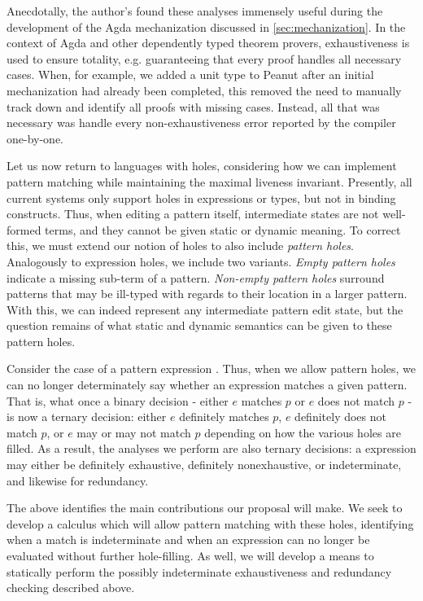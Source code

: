 Anecdotally, the author's found these analyses immensely useful during the development of the Agda mechanization discussed in \autoref{sec:mechanization}. In the context of Agda and other dependently typed theorem provers, exhaustiveness is used to ensure totality, e.g. guaranteeing that every proof handles all necessary cases. When, for example, we added a unit type to Peanut after an initial mechanization had already been completed, this removed the need to manually track down and identify all proofs with missing cases. Instead, all that was necessary was handle every non-exhaustiveness error reported by the compiler one-by-one.

Let us now return to languages with holes, considering how we can implement pattern matching while maintaining the maximal liveness invariant. Presently, all current systems only support holes in expressions or types, but not in binding constructs. Thus, when editing a pattern itself, intermediate states are not well-formed terms, and they cannot be given static or dynamic meaning. To correct this, we must extend our notion of holes to also include \emph{pattern holes}. Analogously to expression holes, we include two variants. \emph{Empty pattern holes} indicate a missing sub-term of a pattern. \emph{Non-empty pattern holes} surround patterns that may be ill-typed with regards to their location in a larger pattern. With this, we can indeed represent any intermediate pattern edit state, but the question remains of what static and dynamic semantics can be given to these pattern holes.

Consider the case of a pattern expression . Thus, when we allow pattern holes, we can no longer determinately say whether an expression matches a given pattern. That is, what once a binary decision - either $e$ matches $p$ or $e$ does not match $p$ - is now a ternary decision: either $e$ definitely matches $p$, $e$ definitely does not match $p$, or $e$ may or may not match $p$ depending on how the various holes are filled. As a result, the analyses we perform are also ternary decisions: a  expression may either be definitely exhaustive, definitely nonexhaustive, or indeterminate, and likewise for redundancy.

The above identifies the main contributions our proposal will make. We seek to develop a calculus which will allow pattern matching with these holes, identifying when a match is indeterminate and when an expression can no longer be evaluated without further hole-filling. As well, we will develop a means to statically perform the possibly indeterminate exhaustiveness and redundancy checking described above.